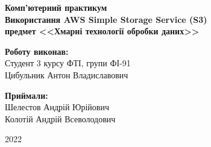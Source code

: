 \begin{titlepage}
    \begin{center}
        \begin{spacing}{1.5}
            \textbf{\Large{Комп'ютерний практикум }} \\
            \textbf{\Large{Використання AWS Simple Storage Service (S3)}} \\ 
            \vspace{1cm}\textbf{\large{предмет <<Хмарні технології обробки даних>>}}
        \end{spacing}
    \end{center}

    \vspace{15em}

    \newlength{\maxname}

    \hfill\parbox{\maxname}{
        \begin{spacing}{1.1}
            \small{\textbf{Роботу виконав:}} \\ 
            \small{Студент 3 курсу ФТІ, групи ФІ-91} \\
            \small{Цибульник Антон Владиславович} \\
        \end{spacing}
    }
         
    \hfill\parbox{\maxname}{
        \begin{spacing}{1.1}
            \small{\textbf{Приймали:}} \\ 
            \small{Шелестов Андрій Юрійович} \\
            \small{Колотій Андрій Всеволодович} \\
        \end{spacing}
    }

    \vspace{\fill}
    
    \begin{center}
        \small{2022}
    \end{center}
    
\end{titlepage}